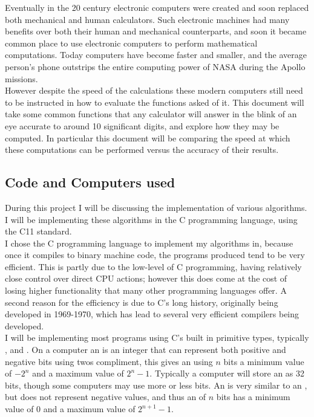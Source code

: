 Eventually in the 20 century electronic computers were created and soon replaced both mechanical and human calculators. Such electronic machines had many benefits over both their human and mechanical counterparts, and soon it became common place to use electronic computers to perform mathematical computations. Today computers have become faster and smaller, and the average person's phone outstrips the entire computing power of NASA during the Apollo missions.\\

However despite the speed of the calculations these modern computers still need to be instructed in how to evaluate the functions asked of it. This document will take some common functions that any calculator will answer in the blink of an eye accurate to around 10 significant digits, and explore how they may be computed. In particular this document will be comparing the speed at which these computations can be performed versus the accuracy of their results.\\

\subsection{Code and Computers used}
\label{SUB_"Code and Computers used"}
During this project I will be discussing the implementation of various algorithms. I will be implementing these algorithms in the C programming language, using the C11 standard.\\

I chose the C programming language to implement my algorithms in, because once it compiles to binary machine code, the programs produced tend to be very efficient. This is partly due to the low-level of C programming, having relatively close control over direct CPU actions; however this does come at the cost of losing higher functionality that many other programming languages offer. A second reason for the efficiency is due to C's long history, originally being developed in 1969-1970, which has lead to several very efficient compilers being developed.\\

I will be implementing most programs using C's built in primitive types, typically ,  and . On a computer an  is an integer that can represent both positive and negative bits using twos compliment, this gives an  using \(n\) bits a minimum value of \(-2^n\) and a maximum value of \(2^n-1\). Typically a computer will store an  as 32 bits, though some computers may use more or less bits. An  is very similar to an , but does not represent negative values, and thus an  of \(n\) bits has a minimum value of \(0\) and a maximum value of \(2^{n+1}-1\).\\

